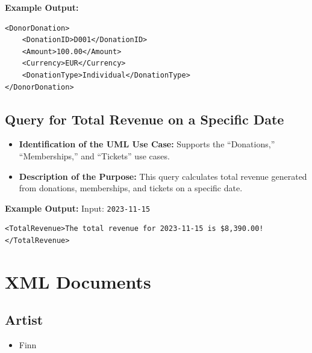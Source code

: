 \documentclass{article} %
\begin{document}
\textbf{Example Output:}
\begin{verbatim}
<DonorDonation>
    <DonationID>D001</DonationID>
    <Amount>100.00</Amount>
    <Currency>EUR</Currency>
    <DonationType>Individual</DonationType>
</DonorDonation>
\end{verbatim}

\subsection{Query for Total Revenue on a Specific Date}
\begin{itemize}
    \item \textbf{Identification of the UML Use Case:} Supports the ``Donations,'' ``Memberships,'' and ``Tickets'' use cases.
    \item \textbf{Description of the Purpose:} This query calculates total revenue generated from donations, memberships, and tickets on a specific date.
\end{itemize}

\textbf{Example Output:}  
Input: \texttt{2023-11-15}  
\begin{verbatim}
<TotalRevenue>The total revenue for 2023-11-15 is $8,390.00!</TotalRevenue>
\end{verbatim}

\newpage
\section{XML Documents}

\subsection{Artist}

\begin{itemize}
    \item Finn
\end{itemize}
\end{document}
